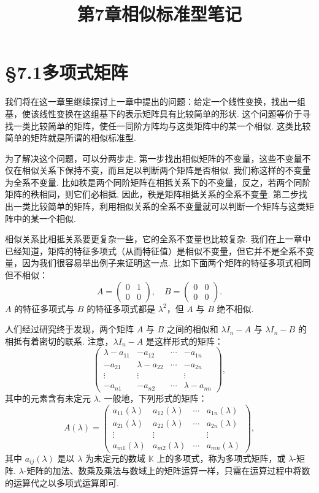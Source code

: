 \documentclass[UTF8,12pt,a4paper,fontset=fandol]{ctexart}
\title{第7章\quad 相似标准型笔记}
\author{}
\date{}
\begin{document}
\maketitle

\section*{§7.1\quad 多项式矩阵}

我们将在这一章里继续探讨上一章中提出的问题：给定一个线性变换，找出一组基，使该线性变换在这组基下的表示矩阵具有比较简单的形状. 这个问题等价于寻找一类比较简单的矩阵，使任一同阶方阵均与这类矩阵中的某一个相似. 这类比较简单的矩阵就是所谓的相似标准型.

为了解决这个问题，可以分两步走. 第一步找出相似矩阵的不变量，这些不变量不仅在相似关系下保持不变，而且足以判断两个矩阵是否相似. 我们称这样的不变量为全系不变量. 比如秩是两个同阶矩阵在相抵关系下的不变量，反之，若两个同阶矩阵的秩相同，则它们必相抵. 因此，秩是矩阵相抵关系的全系不变量. 第二步找出一类比较简单的矩阵，利用相似关系的全系不变量就可以判断一个矩阵与这类矩阵中的某一个相似.

相似关系比相抵关系要更复杂一些，它的全系不变量也比较复杂. 我们在上一章中已经知道，矩阵的特征多项式（从而特征值）是相似不变量，但它并不是全系不变量，因为我们很容易举出例子来证明这一点. 比如下面两个矩阵的特征多项式相同但不相似：
\[
A=\left(\begin{array}{cc}
0 & 1\\
0 & 0
\end{array}\right),\quad
B=\left(\begin{array}{cc}
0 & 0\\
0 & 0
\end{array}\right).
\]
$A$ 的特征多项式与 $B$ 的特征多项式都是 $\lambda^2$，但 $A$ 与 $B$ 绝不相似.

人们经过研究终于发现，两个矩阵 $A$ 与 $B$ 之间的相似和 $\lambda I_n-A$ 与 $\lambda I_n-B$ 的相抵有着密切的联系. 注意，$\lambda I_n-A$ 是这样形式的矩阵：
\[
\left(\begin{array}{cccc}
\lambda-a_{11} & -a_{12} & \cdots & -a_{1n}\\
-a_{21} & \lambda-a_{22} & \cdots & -a_{2n}\\
\vdots & \vdots & & \vdots\\
-a_{n1} & -a_{n2} & \cdots & \lambda-a_{nn}
\end{array}\right),
\]
其中的元素含有未定元 $\lambda$. 一般地，下列形式的矩阵：
\[
A(\lambda)=
\left(\begin{array}{cccc}
a_{11}(\lambda) & a_{12}(\lambda) & \cdots & a_{1n}(\lambda)\\
a_{21}(\lambda) & a_{22}(\lambda) & \cdots & a_{2n}(\lambda)\\
\vdots & \vdots & & \vdots\\
a_{m1}(\lambda) & a_{m2}(\lambda) & \cdots & a_{mn}(\lambda)
\end{array}\right),
\]
其中 $a_{ij}(\lambda)$ 是以 $\lambda$ 为未定元的数域 $\mathbb{K}$ 上的多项式，称为多项式矩阵，或 $\lambda$-矩阵. $\lambda$-矩阵的加法、数乘及乘法与数域上的矩阵运算一样，只需在运算过程中将数的运算代之以多项式运算即可.
\end{document}
